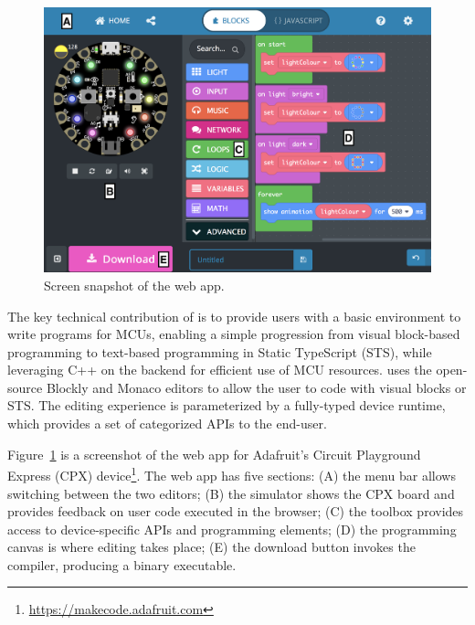 \section{\MC}
\label{sec:makecode}

\begin{figure}[t]
    \includegraphics[width=\columnwidth]{images/makecode-cplay-annotated}
\caption{\label{fig:screenSnap}Screen snapshot of the \MC web app.}
\end{figure}

The key technical contribution of \MC is to provide users with a basic environment to write programs for MCUs, enabling a simple progression from visual block-based programming to text-based programming in Static TypeScript (STS), while leveraging C++ on the backend for efficient use of MCU resources.
\MC uses the open-source Blockly and Monaco editors to allow the user to code with visual blocks or STS. The editing experience is parameterized by a fully-typed device runtime, which provides a set of categorized APIs to the end-user.


Figure~\ref{fig:screenSnap} is a screenshot of the \MC web app for Adafruit's Circuit Playground Express (CPX) device\footnote{\url{https://makecode.adafruit.com}}. The web app has five sections: (A) the menu bar allows switching between the two editors; (B) the simulator shows the CPX board and provides feedback on user code executed in the browser; (C) the toolbox provides access to device-specific APIs and programming elements; (D) the programming canvas is where
editing takes place; (E) the download button invokes the compiler, producing a binary executable.

